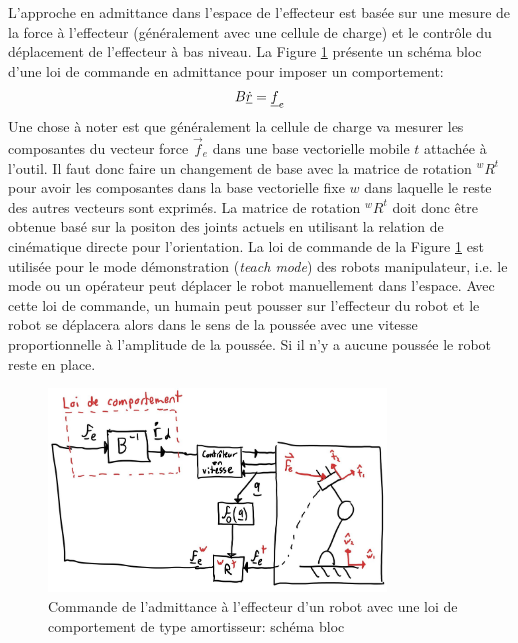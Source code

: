 L'approche en admittance dans l'espace de l'effecteur est basée sur une mesure de la force à l'effecteur (généralement avec une cellule de charge) et le contrôle du déplacement de l'effecteur à bas niveau. La Figure \ref{fig:admittancecontroltaskspace1} présente un schéma bloc d'une loi de commande en admittance pour imposer un comportement: %
\begin{align}
B \underline{\dot{r}} = \underline{f}_e
\end{align}
Une chose à noter est que généralement la cellule de charge va mesurer les composantes du vecteur force $\Vec{f}_e$ dans une base vectorielle mobile $t$ attachée à l'outil. Il faut donc faire un changement de base avec la matrice de rotation ${}^{w}R^t$ pour avoir les composantes dans la base vectorielle fixe $w$ dans laquelle le reste des autres vecteurs sont exprimés. La matrice de rotation ${}^{w}R^t$ doit donc être obtenue basé sur la positon des joints actuels en utilisant la relation de cinématique directe pour l'orientation. La loi de commande de la Figure \ref{fig:admittancecontroltaskspace1} est utilisée pour le mode démonstration (\textit{teach mode}) des robots manipulateur, i.e. le mode ou un opérateur peut déplacer le robot manuellement dans l'espace. Avec cette loi de commande, un humain peut pousser sur l'effecteur du robot et le robot se déplacera alors dans le sens de la poussée avec une vitesse proportionnelle à l'amplitude de la poussée. Si il n'y a aucune poussée le robot reste en place. 
\begin{figure}[h]
	\centering
		\includegraphics[width=0.80\textwidth]{fig/admittancecontroltaskspace1.jpg}
	\caption{Commande de l'admittance à l'effecteur d'un robot avec une loi de comportement de type amortisseur: schéma bloc}
	\label{fig:admittancecontroltaskspace1}
\end{figure}


